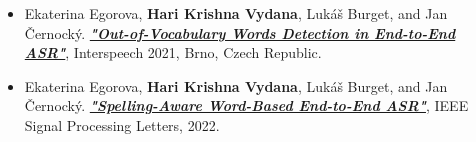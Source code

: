 \documentclass[11pt,a4paper,sans]{moderncv} %
\begin{document}
\begin{itemize}[labelwidth=2mm,labelindent=8pt,leftmargin=2cm,align=left]
\begin{itemize}[itemsep=2mm,labelwidth=0mm,labelindent=5pt,leftmargin=1cm,align=middle]
\begin{itemize}[itemsep=2mm]
        \item[\tiny$\bullet$]{Ekaterina Egorova, \textbf{Hari Krishna Vydana}, Lukáš Burget, and Jan Černocký. \href{https://www.isca-speech.org/archive/pdfs/interspeech_2021/egorova21_interspeech.pdf}{\textbf{\textit{"Out-of-Vocabulary Words Detection in End-to-End ASR"}}}, Interspeech 2021, Brno, Czech Republic.}
        \item[\tiny$\bullet$]{Ekaterina Egorova, \textbf{Hari Krishna Vydana}, Lukáš Burget, and Jan Černocký. \href{https://ieeexplore.ieee.org/stamp/stamp.jsp?tp=&arnumber=9833231}{\textbf{\textit{"Spelling-Aware Word-Based End-to-End ASR"}}}, IEEE Signal Processing Letters, 2022.}
    \end{itemize}
\end{itemize}

\end{itemize}

\end{document}
